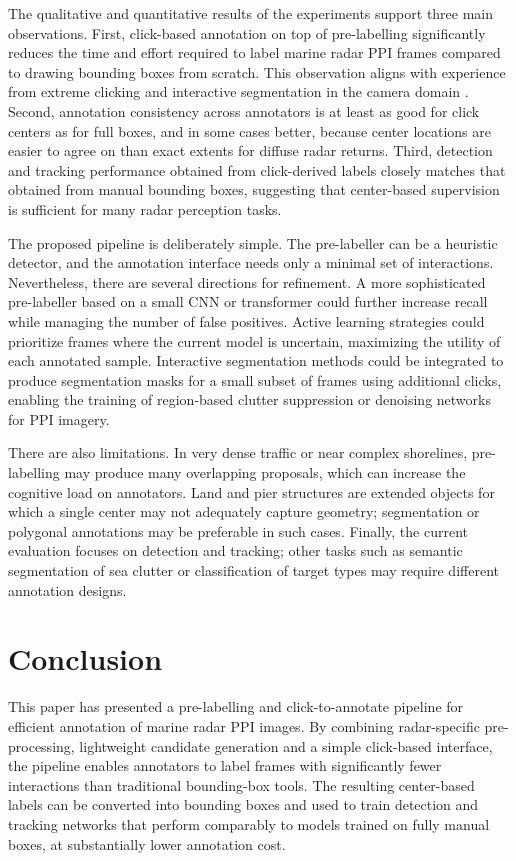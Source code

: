 \documentclass[twocolumn, 10pt]{article}
\begin{document}
The qualitative and quantitative results of the experiments support three main observations. First, click-based annotation on top of pre-labelling significantly reduces the time and effort required to label marine radar PPI frames compared to drawing bounding boxes from scratch. This observation aligns with experience from extreme clicking and interactive segmentation in the camera domain \cite{Papadopoulos2017Extreme,Chen2022FocalClick}. Second, annotation consistency across annotators is at least as good for click centers as for full boxes, and in some cases better, because center locations are easier to agree on than exact extents for diffuse radar returns. Third, detection and tracking performance obtained from click-derived labels closely matches that obtained from manual bounding boxes, suggesting that center-based supervision is sufficient for many radar perception tasks.

The proposed pipeline is deliberately simple. The pre-labeller can be a heuristic detector, and the annotation interface needs only a minimal set of interactions. Nevertheless, there are several directions for refinement. A more sophisticated pre-labeller based on a small CNN or transformer could further increase recall while managing the number of false positives. Active learning strategies could prioritize frames where the current model is uncertain, maximizing the utility of each annotated sample. Interactive segmentation methods could be integrated to produce segmentation masks for a small subset of frames using additional clicks, enabling the training of region-based clutter suppression or denoising networks for PPI imagery.

There are also limitations. In very dense traffic or near complex shorelines, pre-labelling may produce many overlapping proposals, which can increase the cognitive load on annotators. Land and pier structures are extended objects for which a single center may not adequately capture geometry; segmentation or polygonal annotations may be preferable in such cases. Finally, the current evaluation focuses on detection and tracking; other tasks such as semantic segmentation of sea clutter or classification of target types may require different annotation designs.

\section{Conclusion}
\label{sec:conclusion}

This paper has presented a pre-labelling and click-to-annotate pipeline for efficient annotation of marine radar PPI images. By combining radar-specific pre-processing, lightweight candidate generation and a simple click-based interface, the pipeline enables annotators to label frames with significantly fewer interactions than traditional bounding-box tools. The resulting center-based labels can be converted into bounding boxes and used to train detection and tracking networks that perform comparably to models trained on fully manual boxes, at substantially lower annotation cost.
\end{document}
